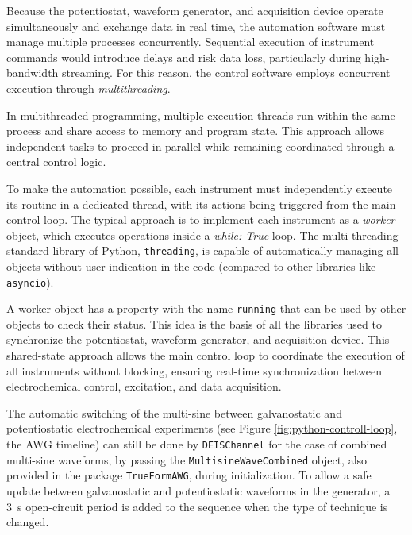 Because the potentiostat, waveform generator, and acquisition device operate simultaneously and exchange data in real time, the automation software must manage multiple processes concurrently.  
Sequential execution of instrument commands would introduce delays and risk data loss, particularly during high-bandwidth streaming.  
For this reason, the control software employs concurrent execution through \emph{multithreading}.

In multithreaded programming, multiple execution threads run within the same process and share access to memory and program state.  
This approach allows independent tasks to proceed in parallel while remaining coordinated through a central control logic.  

To make the automation possible, each instrument must independently execute its routine in a dedicated thread, with its actions being triggered from the main control loop.
The typical approach is to implement each instrument as a \emph{worker} object, which executes operations inside a \emph{while: True} loop.
The multi-threading standard library of Python, \verb|threading|, is capable of automatically managing all objects without user indication in the code (compared to other libraries like \verb|asyncio|).

A worker object has a property with the name \verb|running| that can be used by other objects to check their status.
This idea is the basis of all the libraries used to synchronize the potentiostat, waveform generator, and acquisition device.
This shared-state approach allows the main control loop to coordinate the execution of all instruments without blocking, ensuring real-time synchronization between electrochemical control, excitation, and data acquisition.

The automatic switching of the multi-sine between galvanostatic and potentiostatic electrochemical experiments (see Figure \ref{fig:python-controll-loop}, the AWG timeline) can still be done by \verb|DEISChannel| for the case of combined multi-sine waveforms, by passing the \verb|MultisineWaveCombined| object, also provided in the package \verb|TrueFormAWG|, during initialization.
To allow a safe update between galvanostatic and potentiostatic waveforms in the generator, a 3~s open-circuit period is added to the sequence when the type of technique is changed. 

